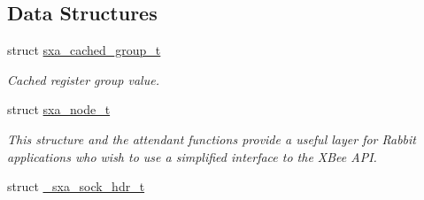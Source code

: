 \subsection*{Data Structures}
\begin{DoxyCompactItemize}
\item 
struct \hyperlink{structsxa__cached__group__t}{sxa\-\_\-cached\-\_\-group\-\_\-t}
\begin{DoxyCompactList}\small\item\em Cached register group value. \end{DoxyCompactList}\item 
struct \hyperlink{structsxa__node__t}{sxa\-\_\-node\-\_\-t}
\begin{DoxyCompactList}\small\item\em This structure and the attendant functions provide a useful layer for Rabbit applications who wish to use a simplified interface to the X\-Bee A\-P\-I. \end{DoxyCompactList}\item 
struct \hyperlink{struct__sxa__sock__hdr__t}{\-\_\-sxa\-\_\-sock\-\_\-hdr\-\_\-t}
\end{DoxyCompactItemize}
